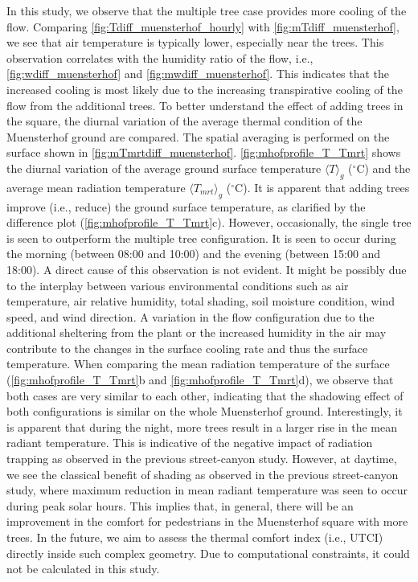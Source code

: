 In this study, we observe that the multiple tree case provides more cooling of the flow. Comparing \cref{fig:Tdiff_muensterhof_hourly} with \cref{fig:mTdiff_muensterhof}, we see that air temperature is typically lower, especially near the trees. This observation correlates with the humidity ratio of the flow, i.e., \cref{fig:wdiff_muensterhof} and \cref{fig:mwdiff_muensterhof}. This indicates that the increased cooling is most likely due to the increasing transpirative cooling of the flow from the additional trees. To better understand the effect of adding trees in the square, the diurnal variation of the average thermal condition of the Muensterhof ground are compared. The spatial averaging is performed on the surface shown in \cref{fig:mTmrtdiff_muensterhof}. \cref{fig:mhofprofile_T_Tmrt} shows the diurnal variation of the average ground surface temperature $\langle T\rangle_g$ ($^{\circ}$C) and the average mean radiation temperature $\langle \textit{T}_{\textit{mrt}}\rangle_g$ ($^{\circ}$C). It is apparent that adding trees improve (i.e., reduce) the ground surface temperature, as clarified by the difference plot (\cref{fig:mhofprofile_T_Tmrt}c). However, occasionally, the single tree is seen to outperform the multiple tree configuration. It is seen to occur during the morning (between 08:00 and 10:00) and the evening (between 15:00 and 18:00). A direct cause of this observation is not evident. It might be possibly due to the interplay between various environmental conditions such as air temperature, air relative humidity, total shading, soil moisture condition, wind speed, and wind direction. A variation in the flow configuration due to the additional sheltering from the plant or the increased humidity in the air may contribute to the changes in the surface cooling rate and thus the surface temperature. When comparing the mean radiation temperature of the surface (\cref{fig:mhofprofile_T_Tmrt}b and \cref{fig:mhofprofile_T_Tmrt}d), we observe that both cases are very similar to each other, indicating that the shadowing effect of both configurations is similar on the whole Muensterhof ground. Interestingly, it is apparent that during the night, more trees result in a larger rise in the mean radiant temperature. This is indicative of the negative impact of radiation trapping as observed in the previous street-canyon study. However, at daytime, we see the classical benefit of shading as observed in the previous street-canyon study, where maximum reduction in mean radiant temperature was seen to occur during peak solar hours. This implies that, in general, there will be an improvement in the comfort for pedestrians in the Muensterhof square with more trees. In the future, we aim to assess the thermal comfort index (i.e., UTCI) directly inside such complex geometry. Due to computational constraints, it could not be calculated in this study.

